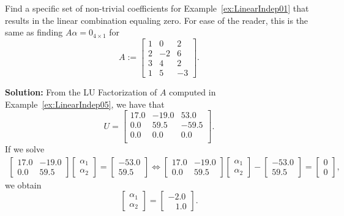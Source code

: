 \begin{example} Find a specific set of non-trivial coefficients for  Example~\ref{ex:LinearIndep01} that results in the linear combination equaling zero. For ease of the reader, this is the same as finding $A\alpha = 0_{4 \times 1}$ for
$$A:= \left[ \begin{array}{rrr} 1  & 0 & 2\\2 & -2 & 6\\  3 & 4 & 2 \\1 & 5 & -3  \end{array} \right]. $$
\end{example}
 \textbf{Solution:}
 From the LU Factorization of $A$ computed in Example~\ref{ex:LinearIndep05}, we have that
 $$ U=\left[
\begin{array}{rrr}
17.0 & -19.0 & 53.0 \\
0.0 & 59.5 & -59.5 \\
0.0 & 0.0 & 0.0 \\
\end{array}
\right].$$
If we solve
\begin{align*}
  \left[
\begin{array}{rr}
17.0 & -19.0 \\
0.0 & 59.5 
\end{array}
\right] \begin{bmatrix}
\alpha_1\\ \alpha_2
\end{bmatrix}= \left[ \begin{array}{r}
     -53.0  \\
     59.5
\end{array} \right] \iff  \left[
\begin{array}{rr}
17.0 & -19.0 \\
0.0 & 59.5 
\end{array}
\right] \begin{bmatrix}
\alpha_1\\ \alpha_2
\end{bmatrix}- \left[ \begin{array}{r}
     -53.0  \\
     59.5
\end{array} \right]=  \begin{bmatrix}
0\\ 0
\end{bmatrix},
\end{align*}
we obtain 
$$\begin{bmatrix}
\alpha_1\\ \alpha_2
\end{bmatrix} = \begin{bmatrix}
-2 .0 \\~~ ~~1.0
\end{bmatrix}.$$
